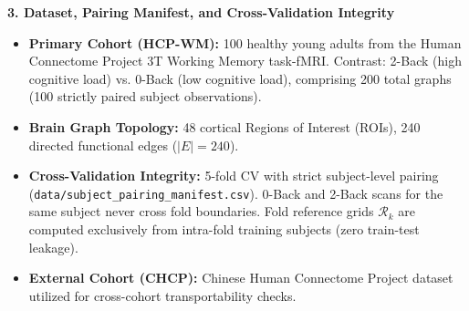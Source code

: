 \documentclass[9pt]{article}
\begin{document}
\textbf{\large 3. Dataset, Pairing Manifest, and Cross-Validation Integrity}\\[1pt]
\begin{itemize}\itemsep -2.5pt
    \item \textbf{Primary Cohort (HCP-WM):} 100 healthy young adults from the Human Connectome Project 3T Working Memory task-fMRI. Contrast: 2-Back (high cognitive load) vs. 0-Back (low cognitive load), comprising 200 total graphs (100 strictly paired subject observations).
    \item \textbf{Brain Graph Topology:} 48 cortical Regions of Interest (ROIs), 240 directed functional edges ($|E| = 240$).
    \item \textbf{Cross-Validation Integrity:} 5-fold CV with strict subject-level pairing (\nolinkurl{data/subject_pairing_manifest.csv}). 0-Back and 2-Back scans for the same subject never cross fold boundaries. Fold reference grids $\mathcal{R}_k$ are computed exclusively from intra-fold training subjects (zero train-test leakage).
    \item \textbf{External Cohort (CHCP):} Chinese Human Connectome Project dataset utilized for cross-cohort transportability checks.
\end{itemize}
\end{document}
